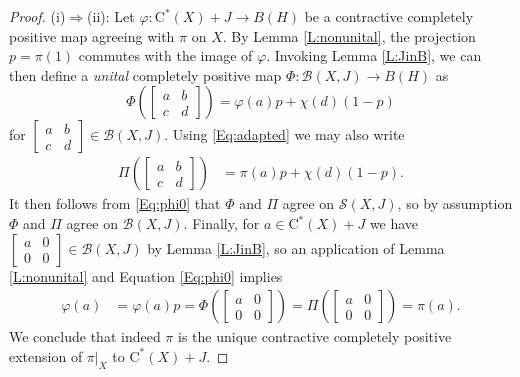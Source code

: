 \documentclass[10pt,a4paper]{amsart}
\newcommand{\B}{{\mathcal{B}}}
\newcommand{\rC}{\mathrm{C}}
\renewcommand{\S}{{\mathcal{S}}}
\renewcommand{\phi}{\varphi}
\begin{document}
\begin{proof}
(i)$\Rightarrow$(ii):   Let $\phi:\rC^*(X)+J \to B(H)$ be a contractive completely positive map agreeing with $\pi$ on $X$. By Lemma \ref{L:nonunital}, the projection $p=\pi(1)$ commutes with the image of $\phi$.
Invoking Lemma \ref{L:JinB}, we can then define a \emph{unital} completely positive map $\Phi:\B(X,J)\to B(H)$ as
\begin{equation}\label{Eq:phi0}
\Phi\left(\begin{bmatrix}
a& b \\ c & d
\end{bmatrix}\right)=\phi(a)p+\chi(d)(1-p)
\end{equation}
 for $\begin{bmatrix}
a& b \\ c & d
\end{bmatrix}\in \B(X,J)$.
Using \eqref{Eq:adapted} we may also write
\begin{align*}
\Pi\left( \begin{bmatrix}
a& b \\ c & d
\end{bmatrix}\right)
&=\pi(a)p+\chi(d)(1-p).
\end{align*}
It then follows from \eqref{Eq:phi0} that $\Phi$ and $\Pi$ agree on $\S(X,J)$, so by assumption $\Phi$ and $\Pi$ agree on $\B(X,J)$. 
Finally, for $a\in \rC^*(X)+J$ we have $\begin{bmatrix}
a& 0 \\ 0 & 0
\end{bmatrix}\in  \B(X,J)$ by  Lemma \ref{L:JinB}, so an application of Lemma \ref{L:nonunital} and Equation \eqref{Eq:phi0} implies
\begin{align*}
\phi(a)&=\phi(a)p=\Phi\left(\begin{bmatrix}
a& 0 \\ 0 & 0
\end{bmatrix}\right)
=\Pi\left(\begin{bmatrix}
a& 0 \\ 0 & 0
\end{bmatrix}\right)=\pi(a).
\end{align*}
We conclude that indeed $\pi$ is the unique contractive completely positive extension of $\pi|_X$ to $\rC^*(X)+J$.
\end{proof}
\end{document}

